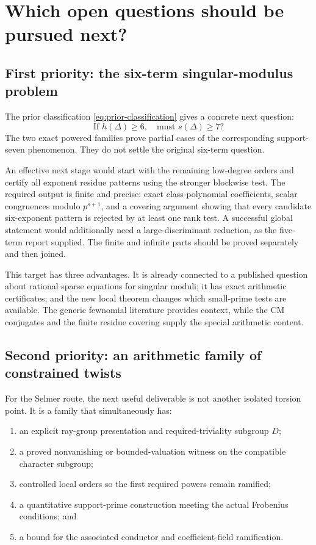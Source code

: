 \section{Which open questions should be pursued next?}

\subsection{First priority: the six-term singular-modulus problem}

The prior classification \eqref{eq:prior-classification} gives a concrete next question:
\[
 \text{If }h(\Delta)\ge6,\quad\text{must }s(\Delta)\ge7?
\]
The two exact powered families prove partial cases of the corresponding support-seven phenomenon. They do not settle the original six-term question.

An effective next stage would start with the remaining low-degree orders and certify all exponent residue patterns using the stronger blockwise test. The required output is finite and precise: exact class-polynomial coefficients, scalar congruences modulo $p^{s+1}$, and a covering argument showing that every candidate six-exponent pattern is rejected by at least one rank test. A successful global statement would additionally need a large-discriminant reduction, as the five-term report supplied. The finite and infinite parts should be proved separately and then joined.

This target has three advantages. It is already connected to a published question about rational sparse equations for singular moduli;\cite{blp} it has exact arithmetic certificates; and the new local theorem changes which small-prime tests are available. The generic fewnomial literature provides context, while the CM conjugates and the finite residue covering supply the special arithmetic content.\cite{fewnomials}

\subsection{Second priority: an arithmetic family of constrained twists}

For the Selmer route, the next useful deliverable is not another isolated torsion point. It is a family that simultaneously has:

\begin{enumerate}
\item an explicit ray-group presentation and required-triviality subgroup $D$;
\item a proved nonvanishing or bounded-valuation witness on the compatible character subgroup;
\item controlled local orders so the first required powers remain ramified;
\item a quantitative support-prime construction meeting the actual Frobenius conditions; and
\item a bound for the associated conductor and coefficient-field ramification.
\end{enumerate}

